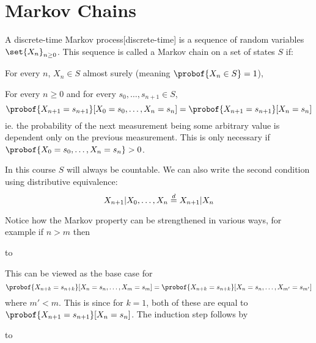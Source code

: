 \section{Markov Chains}

\bdefn

    A {\emphcolor discrete-time Markov process}[discrete-time] is a sequence of random variables $\set{X_n}_{n\geq0}$.
    This sequence is called a {\emphcolor Markov chain} on a set of states $S$ if:
    \benum
        \item For every $n$, $X_n\in S$ almost surely (meaning $\probof{X_n\in S}=1$),
        \item For every $n\geq0$ and for every $s_0,\dots,s_{n+1}\in S$,
        $$\probof{X_{n+1}=s_{n+1}}[X_0=s_0,\dots,X_n=s_n]=\probof{X_{n+1}=s_{n+1}}[X_n=s_n]$$
        ie. the probability of the next measurement being some arbitrary value is dependent only on the previous measurement.
        This is only necessary if $\probof{X_0=s_0,\dots,X_n=s_n}>0$.
    \eenum

\edefn

In this course $S$ will always be countable.
We can also write the second condition using distributive equivalence:
$$ X_{n+1}\vert X_0,\dots,X_n \deq X_{n+1}\vert X_n $$

Notice how the Markov property can be strengthened in various ways, for example if $n>m$ then

\medskip
{\tabskip=0pt
\jot\halign to}
\medskip

This can be viewed as the base case for
$$ \probof{X_{n+k}=s_{n+k}}[X_n=s_n,\dots,X_m=s_m] = \probof{X_{n+k}=s_{n+k}}[X_n=s_n,\dots,X_{m'}=s_{m'}] $$
where $m'<m$.
This is since for $k=1$, both of these are equal to $\probof{X_{n+1}=s_{n+1}}[X_n=s_n]$.
The induction step follows by

\medskip
{\tabskip=0pt
\jot\halign to}
\medskip

